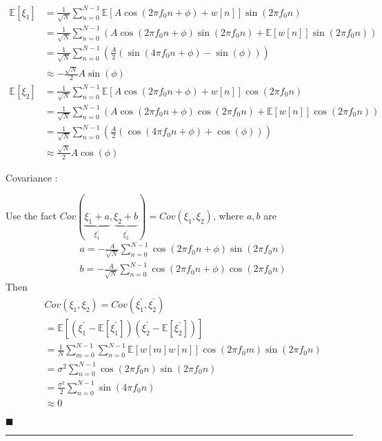 \documentclass[a4paper,12pt]{article}
\begin{document}
\begin{enumerate}
        \begin{align*}
            \mathbb E\left[\xi_1\right]&= \frac{1}{\sqrt{N}}\sum\limits_{n=0}^{N-1}\mathbb E\left[A\cos{(2\pi f_0n+\phi)+w[n]}\right]\sin{(2\pi f_0 n)}\\
            &= \frac{1}{\sqrt{N}}\sum\limits_{n=0}^{N-1}\left(A\cos{(2\pi f_0n+\phi)}\sin{(2\pi f_0n)}+\mathbb E\left[w[n]\right]\sin{(2\pi f_0n)}\right)\\
            &= \frac{1}{\sqrt{N}}\sum\limits_{n=0}^{N-1}\left(\frac{A}{2}(\sin{(4\pi f_0n+\phi)}-\sin{(\phi)})\right)\\
            &\approx -\frac{\sqrt{N}}{2}A\sin{(\phi)}
        \end{align*}
        \begin{align*}
            \mathbb E\left[\xi_2\right] &= \frac{1}{\sqrt{N}}\sum\limits_{n=0}^{N-1}\mathbb E\left[A\cos{(2\pi f_0n+\phi)+w[n]}\right]\cos{(2\pi f_0 n)}\\
            &= \frac{1}{\sqrt{N}}\sum\limits_{n=0}^{N-1}\left(A\cos{(2\pi f_0n+\phi)}\cos{(2\pi f_0n)}+\mathbb E\left[w[n]\right]\cos{(2\pi f_0n)}\right)\\
            &= \frac{1}{\sqrt{N}}\sum\limits_{n=0}^{N-1}\left(\frac{A}{2}(\cos{(4\pi f_0n+\phi)}+\cos{(\phi)})\right)\\
            &\approx \frac{\sqrt{N}}{2}A\cos{(\phi)}
        \end{align*}
        
        Covariance : 
        
        Use the fact $Cov(\underbrace{\xi_1+a}_{\xi_1^{'}},\underbrace{\xi_2+b}_{\xi_2^{'}})=Cov(\xi_1,\xi_2)$, where $a,b$ are 
        \begin{align*}
            &a = -\frac{A}{\sqrt{N}}\sum\limits_{n=0}^{N-1}\cos{(2\pi f_0n+\phi)}\sin{(2\pi f_0n)}\\
            &b = -\frac{A}{\sqrt{N}}\sum\limits_{n=0}^{N-1}\cos{(2\pi f_0n+\phi)}\cos{(2\pi f_0n)}
        \end{align*}
        Then
        \begin{align*}
            &Cov(\xi_1,\xi_2)=Cov(\xi_1^{'},\xi_2^{'})\\
            &= \mathbb E\left[(\xi_1^{'}-\mathbb E\left[\xi_1^{'}\right])(\xi_2^{'}-\mathbb E\left[\xi_2^{'}\right])\right] \\
            &= \frac{1}{N}\sum\limits_{m=0}^{N-1}\sum\limits_{n=0}^{N-1}\mathbb E\left[w[m]w[n]\right]\cos{(2\pi f_0m)}\sin{(2\pi f_0n)}\\
            &= \sigma^2\sum\limits_{n=0}^{N-1}\cos{(2\pi f_0n)}\sin{(2\pi f_0n)}\\
            &= \frac{\sigma^2}{2}\sum\limits_{n=0}^{N-1}\sin{(4\pi f_0n)}\\
            &\approx 0
        \end{align*}
        \begin{flushright}
            $\blacksquare$
        \end{flushright}     
    \end{enumerate}
    \rule{\textwidth}{0.4pt}
\end{document}
